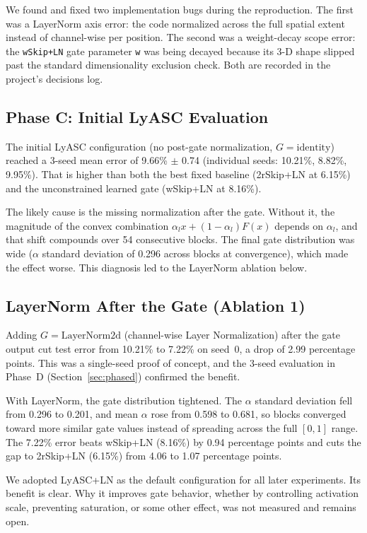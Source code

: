 \documentclass[conference,10pt]{IEEEtran}
\begin{document}
We found and fixed two implementation bugs during the reproduction. The
first was a LayerNorm axis error: the code normalized across the full
spatial extent instead of channel-wise per position. The second was a
weight-decay scope error: the \texttt{wSkip+LN} gate parameter
\texttt{w} was being decayed because its 3-D shape slipped past the
standard dimensionality exclusion check. Both are recorded in the
project's decisions log.


\subsection{Phase C: Initial LyASC Evaluation}
\label{sec:phasec}

The initial LyASC configuration (no post-gate normalization,
$G = \text{identity}$) reached a 3-seed mean error of 9.66\% $\pm$
0.74 (individual seeds: 10.21\%, 8.82\%, 9.95\%). That is higher than
both the best fixed baseline (2rSkip+LN at 6.15\%) and the
unconstrained learned gate (wSkip+LN at 8.16\%).

The likely cause is the missing normalization after the gate. Without
it, the magnitude of the convex combination $\alpha_l x + (1 - \alpha_l) F(x)$
depends on $\alpha_l$, and that shift compounds over 54
consecutive blocks. The final gate distribution was wide ($\alpha$
standard deviation of 0.296 across blocks at convergence), which made
the effect worse. This diagnosis led to the LayerNorm ablation below.


\subsection{LayerNorm After the Gate (Ablation 1)}
\label{sec:ablation1}

Adding $G = \text{LayerNorm2d}$ (channel-wise Layer Normalization) after
the gate output cut test error from 10.21\% to 7.22\% on seed~0, a drop
of 2.99 percentage points. This was a single-seed proof of concept, and
the 3-seed evaluation in Phase~D (Section~\ref{sec:phased}) confirmed
the benefit.

With LayerNorm, the gate distribution tightened. The $\alpha$ standard
deviation fell from 0.296 to 0.201, and mean $\alpha$ rose from 0.598 to
0.681, so blocks converged toward more similar gate values instead of
spreading across the full $[0, 1]$ range. The 7.22\% error beats
wSkip+LN (8.16\%) by 0.94 percentage points and cuts the gap to
2rSkip+LN (6.15\%) from 4.06 to 1.07 percentage points.

We adopted LyASC+LN as the default configuration for all later
experiments. Its benefit is clear. Why it improves gate behavior, whether
by controlling activation scale, preventing saturation, or some other
effect, was not measured and remains open.
\end{document}

